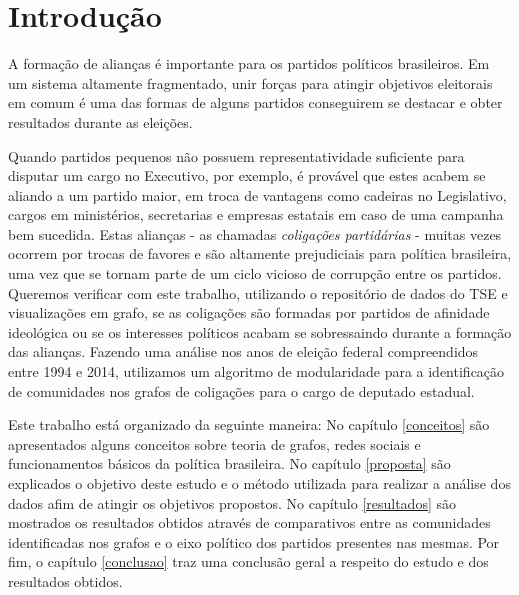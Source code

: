 \chapter{Introdu{\c   c}{\~a}o}
\label{introducao}
\setcounter{page}{6} %



\begin{comment}Por outro lado, existem também o cenário em que partidos pequenos são ideologicamente consistentes e se unem a partidos com ideais e objetivos em comum. \end{comment}

A formação de alianças é importante para os partidos políticos brasileiros. Em um sistema altamente fragmentado, unir forças para atingir objetivos eleitorais em comum é uma das formas de alguns partidos conseguirem se destacar e obter resultados durante as eleições.

Quando partidos pequenos não possuem representatividade suficiente para disputar um cargo no Executivo, por exemplo, é provável que estes acabem se aliando a um partido maior, em troca de vantagens como cadeiras no Legislativo, cargos em ministérios, secretarias e empresas estatais em caso de uma campanha bem sucedida. Estas alianças - as chamadas \emph{coligações partidárias} - muitas vezes ocorrem por trocas de favores e são altamente prejudiciais para política brasileira, uma vez que se tornam parte de um ciclo vicioso de corrupção entre os partidos. Queremos verificar com este trabalho, utilizando o repositório de dados do TSE e visualizações em grafo, se as coligações são formadas por partidos de afinidade ideológica ou se os interesses políticos acabam se sobressaindo durante a formação das alianças. Fazendo uma análise nos anos de eleição federal compreendidos entre 1994 e 2014, utilizamos um algoritmo de modularidade para a identificação de comunidades nos grafos de coligações para o cargo de deputado estadual.

Este trabalho está organizado da seguinte maneira: No capítulo \ref{conceitos} são apresentados alguns conceitos  sobre teoria de grafos, redes sociais e funcionamentos básicos da política brasileira. No capítulo \ref{proposta} são explicados o objetivo deste estudo e o método utilizada para realizar a análise dos dados afim de atingir os objetivos propostos. No capítulo \ref{resultados} são mostrados os resultados obtidos através de comparativos entre as comunidades identificadas nos grafos e o eixo político dos partidos presentes nas mesmas. Por fim, o capítulo \ref{conclusao} traz uma conclusão geral a respeito do estudo e dos resultados obtidos.

